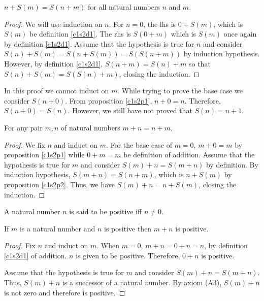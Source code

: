 \begin{prop}\label{c1s2p2}
$n + S(m) = S(n + m)$ for all natural numbers $n$ and $m$.
\end{prop}
\begin{proof}
We will use induction on $n$. For $n = 0$, the lhs is $0 + S(m)$, which
is $S(m)$ be definition \ref{c1s2d1}. The rhs is $S(0 + m)$ which is $S(m)$
once again by definition \ref{c1s2d1}. Assume that the hypothesis is true
for $n$ and consider $S(n) + S(m) = S(n + S(m)) = S(S(n+m))$ by induction
hypothesis. However, by definition \ref{c1s2d1}, $S(n + m) = S(n) + m$ so
that $S(n) + S(m) = S(S(n) + m)$, closing the induction.
\end{proof}

\begin{rem}
In this proof we cannot induct on $m$. While trying to prove the base case
we consider $S(n + 0)$. From proposition \ref{c1s2p1}, $n + 0 = n$. 
Therefore, $S(n + 0) = S(n)$. However, we still have not proved that $S(n)
= n + 1$.
\end{rem}

\begin{prop}\label{c1s2p3}
For any pair $m, n$ of natural numbers $m + n = n + m$.
\end{prop}
\begin{proof}
We fix $n$ and induct on $m$. For the base case of $m = 0$, $m + 0 = m$ by
proposition \ref{c1s2p1} while $0 + m = m$ be definition of addition. 
Assume that the hypothesis is true for $m$ and consider $S(m) + n = S(m+n)$
by definition. By induction hypothesis, $S(m + n) = S(n + m)$, which is $
n + S(m)$ by proposition \ref{c1s2p2}. Thus, we have $S(m) + n = n + S(m)$,
closing the induction.
\end{proof}

\begin{defn}\label{c1s2d2}
A natural number $n$ is said to be positive iff $n \ne 0$.
\end{defn}

\begin{prop}\label{c1s2p4}
If $m$ is a natural number and $n$ is positive then $m + n$ is positive.
\end{prop}
\begin{proof}
Fix $n$ and induct on $m$. When $m = 0$, $m + n = 0 + n = n$, by definition
\ref{c1s2d1} of addition. $n$ is given to be positive. Therefore, $0 + n$
is positive.

Assume that the hypothesis is true for $m$ and consider $S(m) + n = S(m + 
n)$. Thus, $S(m) + n$ is a successor of a natural number. By axiom (A3), 
$S(m) + n$ is not zero and therefore is positive.
\end{proof}

